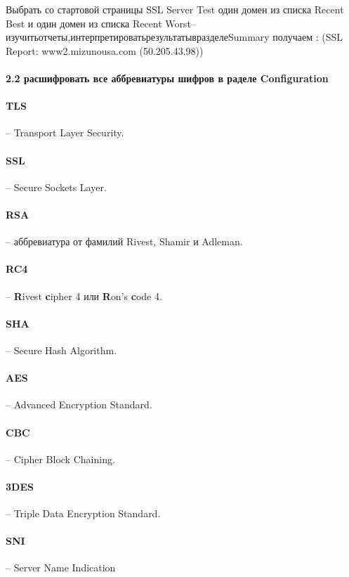 \documentclass[10pt,a4paper]{article}
\begin{document}
 Выбрать со стартовой страницы SSL Server Test один домен из списка Recent Best и один домен из списка Recent Worst–изучитьотчеты,интерпретироватьрезультатывразделеSummary 
 получаем : (SSL Report: www2.mizunousa.com (50.205.43.98))
 
 \paragraph{2.2 расшифровать все аббревиатуры шифров в раделе Configuration }
 
\paragraph{TLS} -- Transport Layer Security.

\paragraph{SSL} -- Secure Sockets Layer.

\paragraph{RSA} -- аббревиатура от фамилий Rivest, Shamir и Adleman.

\paragraph{RC4} -- \textbf{R}ivest \textbf{c}ipher 4 или \textbf{R}on’s \textbf{c}ode 4.

\paragraph{SHA} -- Secure Hash Algorithm.

\paragraph{AES} -- Advanced Encryption Standard.

\paragraph{CBC} -- Cipher Block Chaining.

\paragraph{3DES} -- Triple Data Encryption Standard.

\paragraph{SNI} -- Server Name Indication
\end{document}
